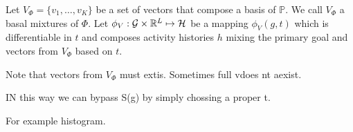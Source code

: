 \begin{definition}
    Let $V_\Phi = \{v_1, \dots, v_K \}$ be a set of vectors that compose a basis of $\mathbb{P}$. We call $V_\Phi$ a basal mixtures of $\Phi$. Let $\phi_V: \mathcal{G} \times \mathbb{R}^L \mapsto \mathcal{H}$ be a mapping $\phi_V(g, t)$ which is differentiable in $t$ and composes activity histories $h$ mixing the primary goal and vectors from $V_\Phi$ based on $t$.
\end{definition}

Note that vectors from $V_\Phi$ must extis. Sometimes full vdoes nt aexist.

IN this way we can bypass S(g) by simply chossing a proper t.

For example histogram.

\begin{proposition}

\end{proposition}
